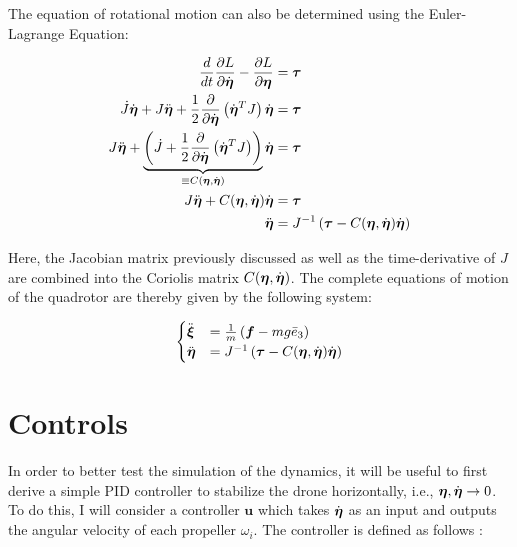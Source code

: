 \documentclass{article}
\begin{document}
The equation of rotational motion can also be determined using the Euler-Lagrange Equation:

\begin{align}
    \frac{d }{d t} \frac{\partial L}{\partial \dot{\boldsymbol{\eta}}} - \frac{\partial L}{\partial \boldsymbol{\eta}} & = \boldsymbol{\tau} \\
    \dot{J} \dot{\boldsymbol{\eta}} + J \ddot{\boldsymbol{\eta}} + 
    \frac{1}{2} \frac{\partial }{\partial \dot{\boldsymbol{\eta}}} \left( \dot{\boldsymbol{\eta}}^T J \right) \dot{\boldsymbol{\eta}}
    & = \boldsymbol{\tau} \\
    J \ddot{\boldsymbol{\eta}} + \underbrace{
    \left( \dot{J} +\frac{1}{2} \frac{\partial }{\partial \dot{\boldsymbol{\eta}}} \left( \dot{\boldsymbol{\eta}}^T J \right) \right)}
    _{\equiv C(\boldsymbol{\eta}, \dot{\boldsymbol{\eta}})}
    \dot{\boldsymbol{\eta}}
    & = \boldsymbol{\tau} \\
    J \ddot{\boldsymbol{\eta}} + C(\boldsymbol{\eta}, \dot{\boldsymbol{\eta}}) \dot{\boldsymbol{\eta}}
    & = \boldsymbol{\tau} \\
    \ddot{\boldsymbol{\eta}} & = 
    J^{-1} \left( \boldsymbol{\tau} - C(\boldsymbol{\eta}, \dot{\boldsymbol{\eta}}) \dot{\boldsymbol{\eta}} \right) \\
\end{align}

Here, the Jacobian matrix previously discussed as well as the time-derivative of $J$ are combined into the Coriolis matrix $C(\boldsymbol{\eta}, \dot{\boldsymbol{\eta}})$. The complete equations of motion of the quadrotor are thereby given by the following system:

\begin{equation}
    \begin{cases}
        \ddot{\boldsymbol{\xi}} & = \frac{1}{m} \left( \boldsymbol{f} - mg \bar{e}_3 \right) \\
        \ddot{\boldsymbol{\eta}} & = 
        J^{-1} \left( \boldsymbol{\tau} - C(\boldsymbol{\eta}, \dot{\boldsymbol{\eta}}) \dot{\boldsymbol{\eta}} \right)
    \end{cases}
\end{equation}

% 

\newpage
\section{Controls}
\label{sec:controls}

\newcommand{\su}{\boldsymbol{u}}
\newcommand{\se}{\boldsymbol{e}}

In order to better test the simulation of the dynamics, it will be useful to first derive a simple PID controller to stabilize the drone horizontally, i.e., $\boldsymbol{\eta}, \dot{\boldsymbol{\eta}} \rightarrow 0$. To do this, I will consider a controller $\su$ which takes $\dot{\boldsymbol{\eta}}$ as an input and outputs the angular velocity of each propeller $\omega_i$. The controller is defined as follows \cite{gibiansky2012andrew}:
\end{document}
